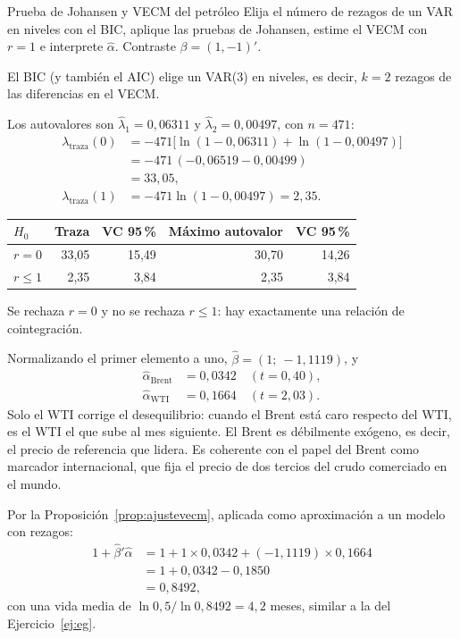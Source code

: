 \begin{ejresuelto}{Prueba de Johansen y VECM del petróleo}\label{ej:johansen}
\enunciado Elija el número de rezagos de un VAR en niveles con el BIC, aplique las pruebas de Johansen, estime el
VECM con $r=1$ e interprete $\hat\alpha$. Contraste $\beta=(1,-1)'$.

\solucion
{} El BIC (y también el AIC) elige un VAR(3) en niveles, es decir, $k=2$ rezagos de las
diferencias en el VECM.

 Los autovalores son $\hat\lambda_1=0{,}06311$ y $\hat\lambda_2=0{,}00497$, con $n=471$:
\begin{align*}
  \lambda_{\text{traza}}(0) &= -471\bigl[\ln(1-0{,}06311)+\ln(1-0{,}00497)\bigr]\\
                            &= -471\,(-0{,}06519-0{,}00499)\\
                            &= 33{,}05,\\[4pt]
  \lambda_{\text{traza}}(1) &= -471\ln(1-0{,}00497)=2{,}35 .
\end{align*}
\begin{center}\small
\begin{tabular}{@{}lrrrr@{}}
\toprule
$H_0$ & Traza & VC 95\,\% & Máximo autovalor & VC 95\,\% \\
\midrule
$r=0$     & 33,05 & 15,49 & 30,70 & 14,26 \\
$r\le1$   & 2,35  & 3,84  & 2,35  & 3,84 \\
\bottomrule
\end{tabular}
\end{center}
Se rechaza $r=0$ y no se rechaza $r\le1$: hay exactamente una relación de cointegración.

 Normalizando el primer elemento a uno, $\hat\beta=(1;\ -1{,}1119)$, y
\begin{align*}
  \hat\alpha_{\text{Brent}} &= 0{,}0342\quad(t=0{,}40),\\
  \hat\alpha_{\text{WTI}}   &= 0{,}1664\quad(t=2{,}03).
\end{align*}
Solo el WTI corrige el desequilibrio: cuando el Brent está caro respecto del WTI, es el WTI el que sube al mes
siguiente. El Brent es débilmente exógeno, es decir, el precio de referencia que lidera. Es coherente con el
papel del Brent como marcador internacional, que fija el precio de dos tercios del crudo comerciado en el mundo.

 Por la Proposición~\ref{prop:ajustevecm}, aplicada como aproximación a un modelo con
rezagos:
\begin{align*}
  1+\hat\beta'\hat\alpha &= 1+1\times0{,}0342+(-1{,}1119)\times0{,}1664\\
                         &= 1+0{,}0342-0{,}1850\\
                         &= 0{,}8492,
\end{align*}
con una vida media de $\ln0{,}5/\ln0{,}8492=4{,}2$ meses, similar a la del Ejercicio~\ref{ej:eg}.


\end{ejresuelto}
